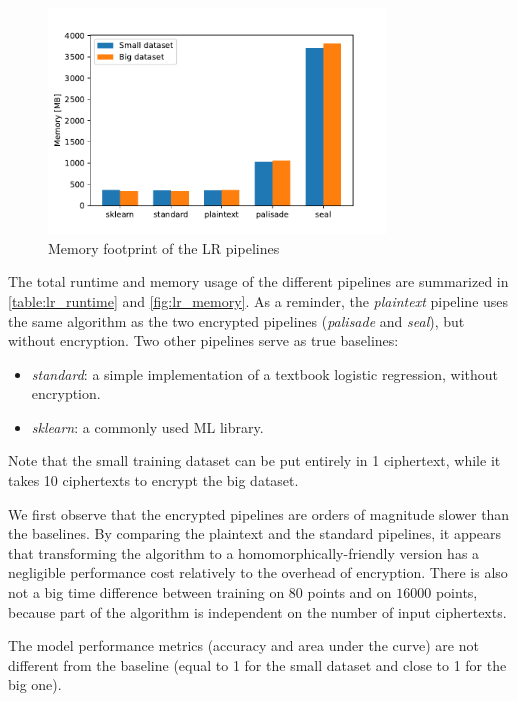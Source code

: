 \documentclass[a4paper,11pt,oneside]{report}
\begin{document}
\begin{figure}[h!]
  \centering
  \includegraphics[width=0.8\textwidth]{figures/lr_mem.pdf}
  \caption{Memory footprint of the LR pipelines}
  \label{fig:lr_memory}
\end{figure}

The total runtime and memory usage of the different pipelines are summarized in \autoref{table:lr_runtime} and \autoref{fig:lr_memory}. 
As a reminder, the \emph{plaintext} pipeline uses the same algorithm as the two encrypted pipelines (\emph{palisade} and \emph{seal}), but without encryption.
Two other pipelines serve as true baselines:
\begin{itemize}
  \item \emph{standard}: a simple implementation of a textbook logistic regression, without encryption.
  \item \emph{sklearn}: a commonly used ML library.
\end{itemize}

Note that the small training dataset can be put entirely in 1 ciphertext, while it takes 10 ciphertexts to encrypt the big dataset.

We first observe that the encrypted pipelines are orders of magnitude slower than the baselines.
By comparing the plaintext and the standard pipelines, it appears that transforming the algorithm to a homomorphically-friendly version has a negligible performance cost relatively to the overhead of encryption.
There is also not a big time difference between training on $80$ points and on $16000$ points, because part of the algorithm is independent on the number of input ciphertexts.

The model performance metrics (accuracy and area under the curve) are not different from the baseline (equal to 1 for the small dataset and close to 1 for the big one).
\end{document}
